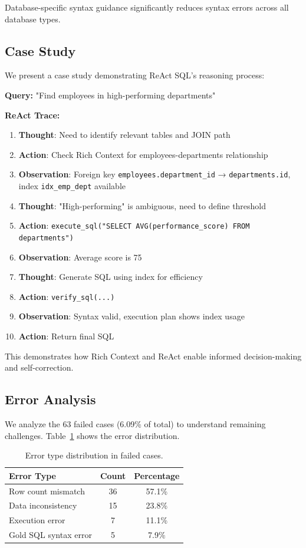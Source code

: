 Database-specific syntax guidance significantly reduces syntax errors across all database types.

\subsection{Case Study}

We present a case study demonstrating ReAct SQL's reasoning process:

\textbf{Query:} "Find employees in high-performing departments"

\textbf{ReAct Trace:}
\begin{enumerate}
    \item \textbf{Thought}: Need to identify relevant tables and JOIN path
    \item \textbf{Action}: Check Rich Context for employees-departments relationship
    \item \textbf{Observation}: Foreign key \texttt{employees.department\_id} → \texttt{departments.id}, index \texttt{idx\_emp\_dept} available
    \item \textbf{Thought}: "High-performing" is ambiguous, need to define threshold
    \item \textbf{Action}: \texttt{execute\_sql("SELECT AVG(performance\_score) FROM departments")}
    \item \textbf{Observation}: Average score is 75
    \item \textbf{Thought}: Generate SQL using index for efficiency
    \item \textbf{Action}: \texttt{verify\_sql(...)}
    \item \textbf{Observation}: Syntax valid, execution plan shows index usage
    \item \textbf{Action}: Return final SQL
\end{enumerate}

This demonstrates how Rich Context and ReAct enable informed decision-making and self-correction.

\subsection{Error Analysis}

We analyze the 63 failed cases (6.09\% of total) to understand remaining challenges. Table~\ref{tab:error_analysis} shows the error distribution.

\begin{table}[h]
\centering
\caption{Error type distribution in failed cases.}
\label{tab:error_analysis}
\begin{tabular}{lcc}
\toprule
\textbf{Error Type} & \textbf{Count} & \textbf{Percentage} \\
\midrule
Row count mismatch & 36 & 57.1\% \\
Data inconsistency & 15 & 23.8\% \\
Execution error & 7 & 11.1\% \\
Gold SQL syntax error & 5 & 7.9\% \\
\bottomrule
\end{tabular}
\end{table}

